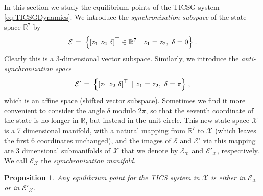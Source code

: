 \documentclass[letterpaper,10pt,conference]{ieeeconf}
\newtheorem{proposition}[theorem]{Proposition}
\newcommand{\rline}  {{\mathbb R}}
\newcommand{\m}      {{\hbox{\hskip 1pt}}}
\newcommand{\Emscr}  {{\mathcal{E}}}
\newcommand{\Xmscr}  {{\mathcal{X}}}
\begin{document}
In this section we study the equilibrium points of the TICSG
system \eqref{eq:TICSGDynamics}. We introduce the {\em synchronization 
subspace} of the state space $\rline^7$ by
\begin{equation} \label{eq:SyncSubspace}
   \Emscr \m=\m \left\{ \left[z_1 \ z_2 \ \delta \right]^\top\in
   \rline^7 \ |\ z_1=z_2,\ \delta = 0 \right\} \m.
\end{equation}
Clearly this is a 3-dimensional vector subspace. Similarly, we
introduce the {\em anti-synchronization space}
\begin{equation} \label{eq:AntiSyncSubspace}
   \Emscr' \m=\m \left\{ \left[z_1 \ z_2 \ \delta \right]^\top
   \ |\ z_1=z_2,\ \delta = \pi \right\} \m,
\end{equation}
which is an affine space (shifted vector subspace). Sometimes we find
it more convenient to consider the angle $\delta$ modulo $2\pi$, so
that the seventh coordinate of the state is no longer in $\rline$, but
instead in the unit circle. This new state space $\Xmscr$ is a 7
dimensional manifold, with a natural mapping from $\rline^7$ to
$\Xmscr$ (which leaves the first 6 coordinates unchanged), and the
images of $\Emscr$ and $\Emscr'$ via this mapping are 3 dimensional
submanifolds of $\Xmscr$ that we denote by $\Emscr_\Xmscr$ and
$\Emscr'_\Xmscr$, respectively. We call $\Emscr_\Xmscr$ the 
{\em symchronization manifold}.

\begin{proposition} \label{EqPointsProp1}
Any equilibrium point for the TICS system in $\Xmscr$ is either in
$\Emscr_\Xmscr$ or in $\Emscr'_\Xmscr$.
\end{proposition}
\end{document}
